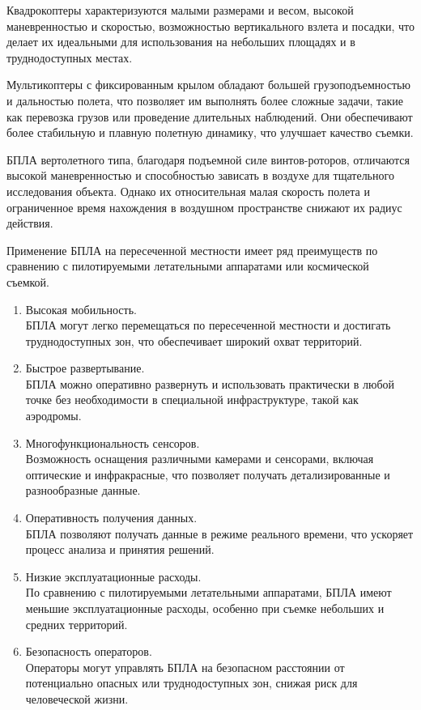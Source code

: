 Квадрокоптеры характеризуются малыми размерами и весом, высокой маневренностью и скоростью, возможностью вертикального взлета и посадки, что делает их идеальными для использования на небольших площадях и в труднодоступных местах.

Мультикоптеры с фиксированным крылом обладают большей грузоподъемностью и дальностью полета, что позволяет им выполнять более сложные задачи, такие как перевозка грузов или проведение длительных наблюдений. Они обеспечивают более стабильную и плавную полетную динамику, что улучшает качество съемки.

БПЛА вертолетного типа, благодаря подъемной силе винтов-роторов, отличаются высокой маневренностью и способностью зависать в воздухе для тщательного исследования объекта. Однако их относительная малая скорость полета и ограниченное время нахождения в воздушном пространстве снижают их радиус действия.

Применение БПЛА на пересеченной местности имеет ряд преимуществ по сравнению с пилотируемыми летательными аппаратами или космической съемкой.

\begin{enumerate}
    \item Высокая мобильность. \\
БПЛА могут легко перемещаться по пересеченной местности и достигать труднодоступных зон, что обеспечивает широкий охват территорий.
\item Быстрое развертывание. \\
БПЛА можно оперативно развернуть и использовать практически в любой точке без необходимости в специальной инфраструктуре, такой как аэродромы.
\item Многофункциональность сенсоров. \\
Возможность оснащения различными камерами и сенсорами, включая оптические и инфракрасные, что позволяет получать детализированные и разнообразные данные.
\item Оперативность получения данных. \\
БПЛА позволяют получать данные в режиме реального времени, что ускоряет процесс анализа и принятия решений.
\item Низкие эксплуатационные расходы. \\
По сравнению с пилотируемыми летательными аппаратами, БПЛА имеют меньшие эксплуатационные расходы, особенно при съемке небольших и средних территорий.
\item Безопасность операторов. \\
Операторы могут управлять БПЛА на безопасном расстоянии от потенциально опасных или труднодоступных зон, снижая риск для человеческой жизни.
\end{enumerate}

